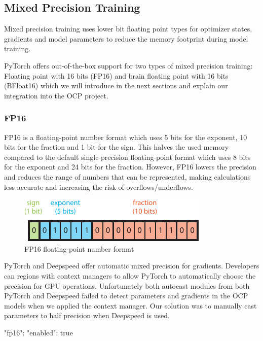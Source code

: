 \subsection{Mixed Precision Training}
\label{subsection:mixedprecision}

Mixed precision training uses lower bit floating point types for optimizer states, gradients and model parameters to 
reduce the memory footprint during model training. 

PyTorch offers out-of-the-box support for two types of mixed precision training: Floating point with 16 bits (FP16) and 
brain floating point with 16 bits (BFloat16) which we will introduce in the next sections and explain our integration 
into the OCP project.

\subsubsection{FP16}

FP16 is a floating-point number format which uses 5 bits for the exponent, 10 bits for the fraction and 1 bit for the 
sign. This halves the used memory compared to the default single-precision floating-point format which uses 8 bits 
for the exponent and 24 bits for the fraction. However, FP16 lowers the precision and reduces the range of numbers 
that can be represented, making calculations less accurate and increasing the risk of overflows/underflows.

\begin{figure}[H]
    \centering
    \includegraphics{figures/mixed_precision/float16.pdf}
    \caption{FP16 floating-point number format}
\end{figure}

PyTorch and Deepspeed offer automatic mixed precision for gradients. Developers can regions with context managers 
to allow PyTorch to automatically choose the precision for GPU operations. Unfortunately both autocast modules from 
both PyTorch and Deepspeed failed to detect parameters and gradients in the OCP models when we applied the context 
manager. Our solution was to manually cast parameters to half precision when Deepspeed is used. 

\begin{json}
"fp16": {
    "enabled": true
}
\end{json}

